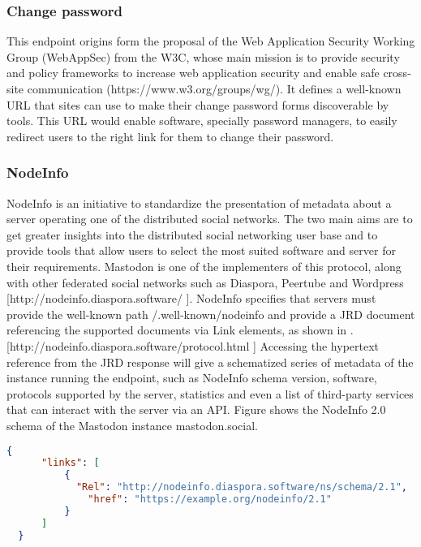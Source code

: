 \subsubsection{Change password}
This endpoint origins form the proposal of the Web Application Security Working Group (WebAppSec) from the W3C, whose main mission is to provide security and policy frameworks to increase web application security and enable safe cross-site communication (https://www.w3.org/groups/wg/). It defines a well-known URL that sites can use to make their change password forms discoverable by tools. This URL would enable software, specially password managers, to easily redirect users to the right link for them to change their password.

\subsubsection{NodeInfo}
NodeInfo is an initiative to standardize the presentation of metadata about a server operating one of the distributed social networks. The two main aims are to get greater insights into the distributed social networking user base and to provide tools that allow users to select the most suited software and server for their requirements. Mastodon is one of the implementers of this protocol, along with other federated social networks such as Diaspora, Peertube and Wordpress [http://nodeinfo.diaspora.software/ ]. NodeInfo specifies that servers must provide the well-known path /.well-known/nodeinfo and provide a JRD document referencing the supported documents via Link elements, as shown in \label{NodeInfo response example}. [http://nodeinfo.diaspora.software/protocol.html ] Accessing the hypertext reference from the JRD response will give a schematized series of metadata of the instance running the endpoint, such as NodeInfo schema version, software, protocols supported by the server, statistics and even a list of third-party services that can interact with the server via an API. Figure \label{NodeInfo response for mastodon.social} shows the NodeInfo 2.0 schema of the Mastodon instance mastodon.social. 

\begin{lstlisting}[language=json, caption=NodeInfo response example, label=NodeInfo response example, float=H]
  {
      "links": [
          {
            "Rel": "http://nodeinfo.diaspora.software/ns/schema/2.1",
              "href": "https://example.org/nodeinfo/2.1"
          }
      ]
  }
\end{lstlisting}

